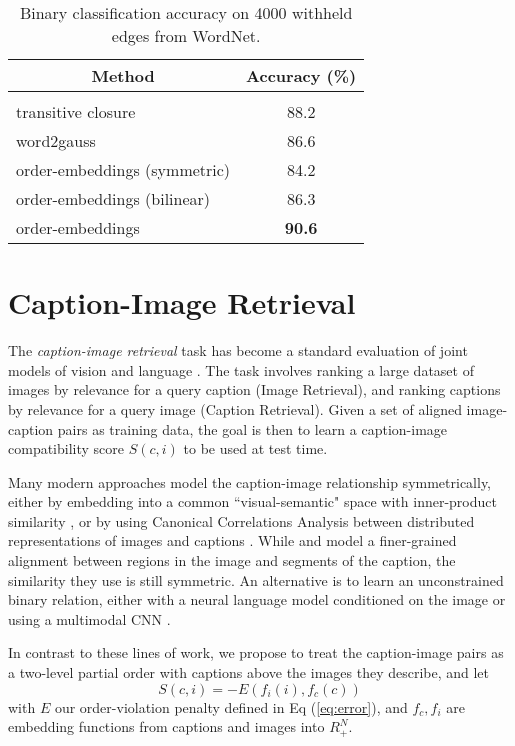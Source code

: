 \documentclass{article} \usepackage{iclr2016_conference,times}
\begin{document}
\begin{table}[t]
	\begin{center}
		\begin{tabular}{lc}
			\multicolumn{1}{c}{\bf Method}  &\multicolumn{1}{c}{\bf Accuracy (\%)}
			\\ \hline \\
			transitive closure & 88.2 \\
			word2gauss  &  86.6\\
			order-embeddings (symmetric) & 84.2 \\
			order-embeddings (bilinear) & 86.3 \\
			order-embeddings  & \textbf{90.6} \\
		\end{tabular}
	\end{center}
	\caption{Binary classification accuracy on 4000 withheld edges from WordNet.}
	\label{wordnet}
\end{table}
 
\section{Caption-Image Retrieval}
\label{retrieval}
The {\it caption-image retrieval} task has become a standard evaluation of joint models of vision and language  \citep{hodosh2013framing,LinCVPR14}. The task involves ranking a large dataset of images by relevance for a query caption (Image Retrieval), and ranking captions by relevance for a query image (Caption Retrieval). Given a set of aligned image-caption pairs as training data, the goal is then to learn a caption-image compatibility score $S(c,i)$ to be used at test time.


Many modern approaches model the caption-image relationship symmetrically, either by embedding into a common ``visual-semantic" space with inner-product similarity  \citep{socher2014grounded, kiros2014}, or by using Canonical Correlations Analysis between distributed representations of images and captions \citep{klein2015fisher}. While \citet{karpathydeep} and \citet{plummer2015flickr30k} model a finer-grained alignment between regions in the image and segments of the caption, the similarity they use is still symmetric.
An alternative is to learn an unconstrained binary relation, either with a neural language model conditioned on the image \citep{vinyals2015show,mao2015} or using a multimodal CNN \citep{ma2015multimodal}.

In contrast to  these lines of work, we propose to treat the caption-image pairs as a two-level partial order with captions above the images they describe, and let 
$$S(c,i) = - E(f_i(i), f_c(c)) $$
with $E$ our order-violation penalty defined in Eq (\ref{eq:error}), and $f_c, f_i$ are embedding functions from captions and images into $R_+^N$.
\end{document}
